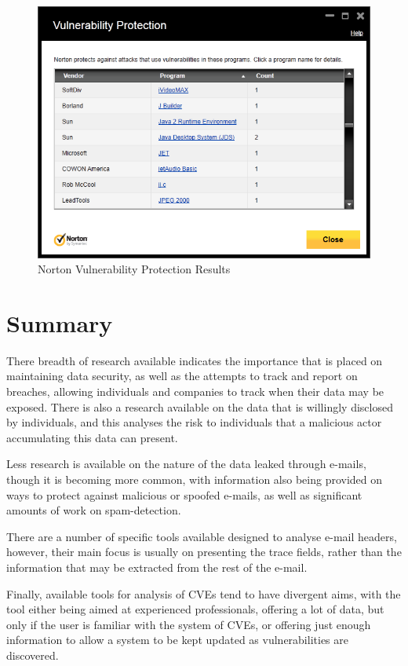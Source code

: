 \begin{figure}[h!t]  \centering \includegraphics[width=0.9\linewidth]{norton-cve}

	 \caption{Norton Vulnerability Protection Results}\label{fig:nort}
\end{figure}

\section{Summary}

There breadth of research available indicates the importance that is placed on
maintaining data security, as well as the attempts to track and report on
breaches, allowing individuals and companies to track when their data may be
exposed.  There is also a research available on the data that is willingly
disclosed by individuals, and this analyses the risk to individuals that a
malicious actor accumulating this data can present. 

Less research is available on the nature of the data leaked through e-mails,
though it is becoming more common, with information also being provided on ways
to protect against malicious or spoofed e-mails, as well as significant amounts
of work on spam-detection.

There are a number of specific tools available designed to analyse e-mail
headers, however, their main focus is usually on presenting the trace fields,
rather than the information that may be extracted from the rest of the e-mail.

Finally, available tools for analysis of CVEs tend to have divergent aims, with
the tool either being aimed at experienced professionals, offering a lot of
data, but only if the user is familiar with the system of CVEs, or offering
just enough information to allow a system to be kept updated as vulnerabilities
are discovered.
